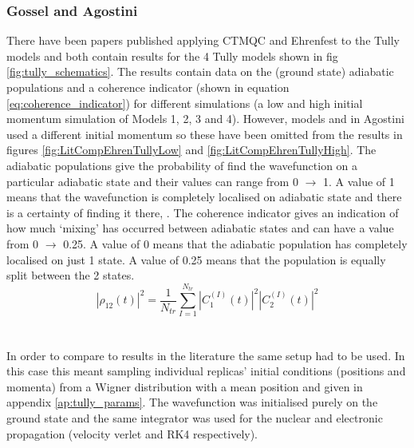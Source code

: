 \subsubsection{Gossel and Agostini}
\label{sect:EhrenCompare}
There have been  papers published applying CTMQC and Ehrenfest to the Tully models \cite{gossel_coupled-trajectory_2018, agostini_quantum-classical_2016} and both contain results for the 4 Tully models shown in fig \ref{fig:tully_schematics}. The results contain data on the (ground state) adiabatic populations and a coherence indicator (shown in equation \eqref{eq:coherence_indicator}) for  different simulations (a low and high initial momentum simulation of Models 1, 2, 3 and 4). However, models  and  in Agostini \cite{agostini_quantum-classical_2016} used a different initial momentum so these have been omitted from the results in figures \ref{fig:LitCompEhrenTullyLow} and \ref{fig:LitCompEhrenTullyHigh}. The adiabatic populations give the probability of find the wavefunction on a particular adiabatic state and their values can range from 0 $\rightarrow$ 1. A value of 1 means that the wavefunction is completely localised on  adiabatic state and there is a certainty of finding it there, . The coherence indicator gives an indication of how much `mixing' has occurred between adiabatic states and can have a value from 0 $\rightarrow$ 0.25. A value of 0 means that the adiabatic population has completely localised on just 1 state. A value of 0.25 means that the population is equally split between the 2 states.
\begin{equation}
	|\rho_{12}(t)|^2 = \frac{1}{N_{tr}} \sum_{I=1}^{N_{tr}} |C_{1}^{(I)}(t)|^2 |C_{2}^{(I)}(t)|^2
	\label{eq:coherence_indicator}
\end{equation}
\\\\
In order to compare to results in the literature the same setup had to be used. In this case this meant sampling individual replicas' initial conditions (positions and momenta) from a Wigner distribution with a mean position and  given in appendix \ref{ap:tully_params}. The wavefunction was initialised purely on the ground state and the same integrator was used for the nuclear and electronic propagation (velocity verlet and RK4 respectively).
